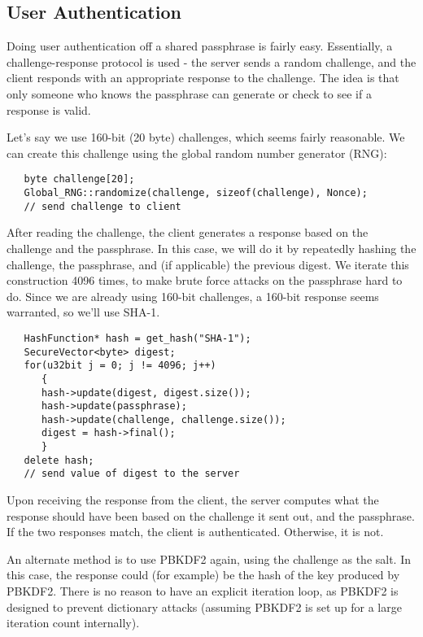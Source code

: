 \documentclass{article}
\begin{document}
\subsection{User Authentication}

Doing user authentication off a shared passphrase is fairly easy. Essentially,
a challenge-response protocol is used - the server sends a random challenge,
and the client responds with an appropriate response to the challenge. The idea
is that only someone who knows the passphrase can generate or check to see if a
response is valid.

Let's say we use 160-bit (20 byte) challenges, which seems fairly reasonable. We
can create this challenge using the global random number generator (RNG):

\begin{verbatim}
   byte challenge[20];
   Global_RNG::randomize(challenge, sizeof(challenge), Nonce);
   // send challenge to client
\end{verbatim}

After reading the challenge, the client generates a response based on the
challenge and the passphrase. In this case, we will do it by repeatedly hashing
the challenge, the passphrase, and (if applicable) the previous digest. We
iterate this construction 4096 times, to make brute force attacks on the
passphrase hard to do. Since we are already using 160-bit challenges, a 160-bit
response seems warranted, so we'll use SHA-1.

\begin{verbatim}
   HashFunction* hash = get_hash("SHA-1");
   SecureVector<byte> digest;
   for(u32bit j = 0; j != 4096; j++)
      {
      hash->update(digest, digest.size());
      hash->update(passphrase);
      hash->update(challenge, challenge.size());
      digest = hash->final();
      }
   delete hash;
   // send value of digest to the server
\end{verbatim}

Upon receiving the response from the client, the server computes what the
response should have been based on the challenge it sent out, and the
passphrase. If the two responses match, the client is authenticated.
Otherwise, it is not.

An alternate method is to use PBKDF2 again, using the challenge as the salt. In
this case, the response could (for example) be the hash of the key produced by
PBKDF2. There is no reason to have an explicit iteration loop, as PBKDF2 is
designed to prevent dictionary attacks (assuming PBKDF2 is set up for a large
iteration count internally).
\end{document}
